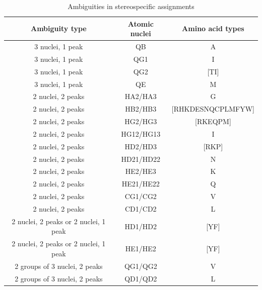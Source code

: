 \begin{table}
  \begin{tabular}{ | c | c | c |}
    \hline
    Ambiguity type    &  Atomic nuclei &  Amino acid types     \\  \hline 
    3 nuclei, 1 peak   &  QB           &  A                    \\  \hline 
    3 nuclei, 1 peak   &  QG1          &  I                    \\  \hline 
    3 nuclei, 1 peak   &  QG2          &  [TI]                 \\  \hline 
    3 nuclei, 1 peak   &  QE           &  M                    \\  \hline 
    2 nuclei, 2 peaks  &  HA2/HA3      &  G                    \\  \hline 
    2 nuclei, 2 peaks  &  HB2/HB3      &  [RHKDESNQCPLMFYW]    \\  \hline 
    2 nuclei, 2 peaks  &  HG2/HG3      &  [RKEQPM]             \\  \hline 
    2 nuclei, 2 peaks  &  HG12/HG13    &  I                    \\  \hline 
    2 nuclei, 2 peaks  &  HD2/HD3      &  [RKP]                \\  \hline 
    2 nuclei, 2 peaks  &  HD21/HD22    &  N                    \\  \hline 
    2 nuclei, 2 peaks  &  HE2/HE3      &  K                    \\  \hline 
    2 nuclei, 2 peaks  &  HE21/HE22    &  Q                    \\  \hline 
    2 nuclei, 2 peaks  &  CG1/CG2      &  V                    \\  \hline 
    2 nuclei, 2 peaks  &  CD1/CD2      &  L                    \\  \hline 
    2 nuclei, 2 peaks or 2 nuclei, 1 peak  &  HD1/HD2  &  [YF]  \\  \hline 
    2 nuclei, 2 peaks or 2 nuclei, 1 peak  &  HE1/HE2  &  [YF]  \\  \hline 
    2 groups of 3 nuclei, 2 peaks  &  QG1/QG2  &  V            \\  \hline
    2 groups of 3 nuclei, 2 peaks  &  QD1/QD2  &  L            \\  \hline
  \end{tabular}
  \caption{Ambiguities in stereospecific assignments}
  \label{stereospecific_ambiguities}
\end{table}

